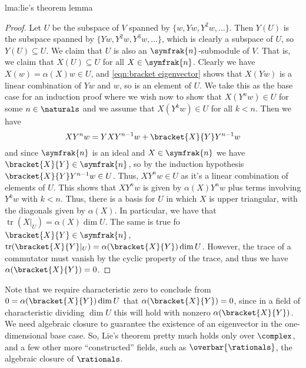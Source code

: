 \documentclass[fleqn]{NotesClass}
\DeclareMathOperator{\tr}{tr}
\newcommand{\nilpotentLie}{\symfrak{n}}
\begin{document}
\begin{lma}{}{lma:lie's theorem lemma}
\begin{proof}
            Let \(U\) be the subspace of \(V\) spanned by \(\{w, Yw, Y^2w, \dotsc\}\).
            Then \(Y(U)\) is the subspace spanned by \(\{Yw, Y^2w, Y^3w, \dotsc\}\), which is clearly a subspace of \(U\), so \(Y(U) \subseteq U\).
            We claim that \(U\) is also an \(\nilpotentLie\)-submodule of \(V\).
            That is, we claim that \(X(U) \subseteq U\) for all \(X \in \nilpotentLie\).
            Clearly we have \(X(w) = \alpha(X)w \in U\), and \cref{eqn:bracket eigenvector} shows that \(X(Yw)\) is a linear combination of \(Yw\) and \(w\), so is an element of \(U\).
            We take this as the base case for an induction proof where we wish now to show that \(X(Y^nw) \in U\) for some \(n \in \naturals\) and we assume that \(X(Y^kw) \in U\) for all \(k < n\).
            Then we have
            \begin{equation}
                XY^nw = YXY^{n-1}w + \bracket{X}{Y}Y^{n-1}w
            \end{equation}
            and since \(\nilpotentLie\) is an ideal and \(X \in \nilpotentLie\) we have \(\bracket{X}{Y} \in \nilpotentLie\), so by the induction hypothesis \(\bracket{X}{Y}Y^{n-1}w \in U\).
            Thus, \(XY^nw \in U\) as it's a linear combination of elements of \(U\).
            This shows that \(XY^nw\) is given by \(\alpha(X)Y^nw\) plus terms involving \(Y^kw\) with \(k < n\).
            Thus, there is a basis for \(U\) in which \(X\) is upper triangular, with the diagonals given by \(\alpha(X)\).
            In particular, we have that \(\tr(X|_U) = \alpha(X) \dim U\).
            The same is true fo \(\bracket{X}{Y} \in \nilpotentLie\), \(\tr(\bracket{X}{Y}|_U) = \alpha(\bracket{X}{Y}) \dim U\).
            However, the trace of a commutator must vanish by the cyclic property of the trace, and thus we have \(\alpha(\bracket{X}{Y}) = 0\).
        \end{proof}
    \end{lma}
    
    Note that we require characteristic zero to conclude from \(0 = \alpha(\bracket{X}{Y}) \dim U\) that \(\alpha(\bracket{X}{Y}) = 0\), since in a field of characteristic dividing \(\dim U\) this will hold with nonzero \(\alpha(\bracket{X}{Y})\).
    We need algebraic closure to guarantee the existence of an eigenvector in the one-dimensional base case.
    So, Lie's theorem pretty much holds only over \(\complex\), and a few other more \enquote{constructed} fields, such as \(\overbar{\rationals}\), the algebraic closure of \(\rationals\).
    
\end{document}
